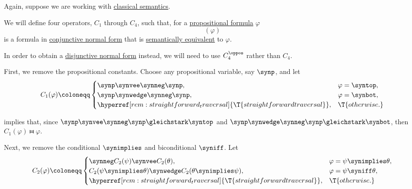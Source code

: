 \begin{algorithm}\label{alg:cnf_and_dnf}
  Again, suppose we are working with \hyperref[def:truth_value_algebra/classical]{classical semantics}.

  We will define four operators, \( C_1 \) through \( C_4 \), such that, for a \hyperref[def:propositional_formula]{propositional formula} \( \varphi \)
  \begin{equation*}
    [C_4 \bincirc C_3 \bincirc C_2 \bincirc C_1](\varphi)
  \end{equation*}
  is a formula in \hyperref[def:cnf_and_dnf]{conjunctive normal form} that is \hyperref[def:semantic_equivalence]{semantically equivalent} to \( \varphi \).

  In order to obtain a \hyperref[def:cnf_and_dnf]{disjunctive normal form} instead, we will need to use \( C_4^\oppos \) rather than \( C_4 \).

  \begin{thmenum}
     First, we remove the propositional constants. Choose any propositional variable, say \( \synp \), and let
    \begin{equation*}
      C_1(\varphi) \coloneqq \begin{cases}
        \synp \synvee \synneg \synp,                                             &\varphi = \syntop, \\
        \synp \synwedge \synneg \synp,                                           &\varphi = \synbot, \\
        \hyperref[rem:straightforward_traversal]{\T{straightforward traversal}}, &\T{otherwise.}
      \end{cases}
    \end{equation*}

     implies that, since \( \synp \synvee \synneg \synp \gleichstark \syntop \) and \( \synp \synwedge \synneg \synp \gleichstark \synbot \), then \( C_1(\varphi) \gleichstark \varphi \).

     Next, we remove the conditional \( \synimplies \) and biconditional \( \syniff \). Let
    \begin{equation*}
      C_2(\varphi) \coloneqq \begin{cases}
        \synneg C_2(\psi) \synvee C_2(\theta),                                   &\varphi = \psi \synimplies \theta, \\
        C_2(\psi \synimplies \theta) \synwedge C_2(\theta \synimplies \psi),     &\varphi = \psi \syniff \theta, \\
        \hyperref[rem:straightforward_traversal]{\T{straightforward traversal}}, &\T{otherwise.}
      \end{cases}
    \end{equation*}


\end{thmenum}
\end{algorithm}
